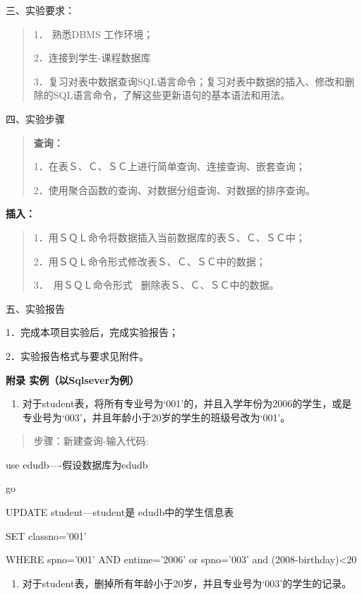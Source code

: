 \documentclass[
]{article}
\begin{document}
三、实验要求：

\begin{quote}
1． 熟悉DBMS 工作环境；

2．连接到学生-课程数据库

3．复习对表中数据查询SQL语言命令；复习对表中数据的插入、修改和删除的SQL语言命令，了解这些更新语句的基本语法和用法。
\end{quote}

四、实验步骤

\begin{quote}
\textbf{查询：}

1．在表Ｓ、Ｃ、ＳＣ上进行简单查询、连接查询、嵌套查询；

2．使用聚合函数的查询、对数据分组查询、对数据的排序查询。
\end{quote}

\textbf{插入：}

\begin{quote}
1．用ＳＱＬ命令将数据插入当前数据库的表Ｓ、Ｃ、ＳＣ中；

2．用ＳＱＬ命令形式修改表Ｓ、Ｃ、ＳＣ中的数据；

3．~用ＳＱＬ命令形式~ 删除表Ｓ、Ｃ、ＳＣ中的数据。
\end{quote}

五、实验报告

1．完成本项目实验后，完成实验报告；

2．实验报告格式与要求见附件。

\textbf{附录 实例（以Sqlsever为例）}

\begin{enumerate}
\def\labelenumi{\arabic{enumi}.}
\item
  对于student表，将所有专业号为`001'的，并且入学年份为2006的学生，或是专业号为`003'，并且年龄小于20岁的学生的班级号改为`001'。
\end{enumerate}

\begin{quote}
步骤：新建查询-输入代码:
\end{quote}

use edudb----假设数据库为edudb

go

UPDATE student---student是 edudb中的学生信息表

SET classno='001'

WHERE spno='001' AND entime='2006' or spno='003' and
(2008-birthday)\textless20

\begin{enumerate}
\def\labelenumi{\arabic{enumi}.}
\setcounter{enumi}{1}
\item
  对于student表，删掉所有年龄小于20岁，并且专业号为`003'的学生的记录。
\end{enumerate}
\end{document}
